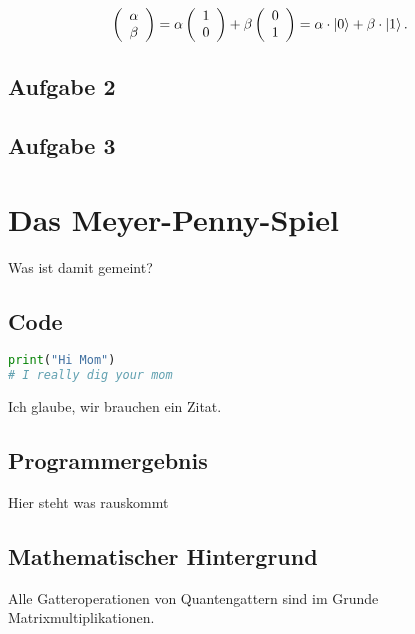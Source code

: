 \begin{align}
    \left(\begin{array}{c}
        \alpha\\
        \beta
    \end{array}\right) 
    =
    \alpha \left(\begin{array}{c}
        1\\
        0   
    \end{array}\right) 
    +
    \beta \left(\begin{array}{c}
        0\\
        1   
    \end{array}\right) 
    =
    \alpha \cdot \ket{0}+\beta \cdot \ket{1}.
\end{align}



\section{Aufgabe 2}
\section{Aufgabe 3}
\chapter{Das Meyer-Penny-Spiel}
Was ist damit gemeint?

\section{Code}
\begin{lstlisting}[caption=Python-Code \texttt{./mybestpython.py}, label=pythoncodebeispiel, language=python]
print("Hi Mom") 
# I really dig your mom
\end{lstlisting}
Ich glaube, wir brauchen ein Zitat\cite{NielsenChuang}.

\section{Programmergebnis}
Hier steht was rauskommt
\section{Mathematischer Hintergrund}
Alle Gatteroperationen von Quantengattern sind im Grunde Matrixmultiplikationen.


